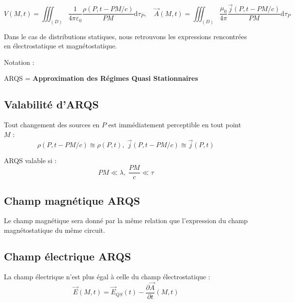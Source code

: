 \begin{equation}
  V(M,t) = \iiint _{(D)} \frac{1}{4 \pi \varepsilon_0} \frac{\rho(P, t - PM/c)}{PM}  \mathrm{d} \tau_P, \quad 
  \overrightarrow{A}(M,t) = \iiint _{(D)} \frac{\mu_0}{4 \pi} \frac{\overrightarrow{j}(P, t - PM/c)}{PM}  \mathrm{d} \tau_P
\end{equation}

Dans le cas de distributions statiques, nous retrouvons les expressions rencontrées en électrostatique et magnétostatique.

\begin{tcolorbox}
Notation : 

    ARQS = \textbf{Approximation des Régimes Quasi Stationnaires}
\end{tcolorbox}

\subsection{Valabilité d'ARQS} %

Tout changement des sources en $P$ est immédiatement perceptible en tout point $M$ : 
\begin{equation}
  \rho(P, t - PM/c) \approxeq \rho(P,t), \; \overrightarrow{j}(P, t - PM/c) \approxeq \overrightarrow{j}(P,t)
\end{equation}

ARQS valable si : 
\begin{equation}
  PM \ll \lambda, \; \frac{PM}{c}  \ll \tau
\end{equation}

\subsection{Champ magnétique ARQS} %
\label{sub:Champ magnétique}

Le champ magnétique sera donné par la même relation que l'expression du champ magnétostatique du même circuit.

\subsection{Champ électrique ARQS} %

La champ électrique n'est plus égal à celle du champ électrostatique : 
\begin{equation}
  \overrightarrow{E}(M,t) = \overrightarrow{E} _{QS}(t) - \frac{\partial \overrightarrow{A}}{\partial t} (M,t)
\end{equation}

